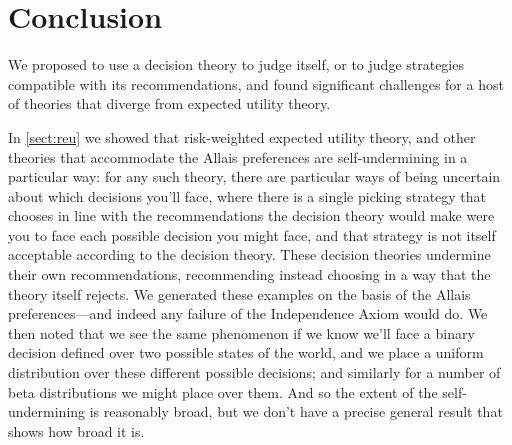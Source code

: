 \documentclass[a4paper]{article}
\newcommand\U{\mathfrak{U}} %
\newcommand{\todoold}[2][]{\todo[backgroundcolor=white,bordercolor=orange!10,linecolor=gray!10, #1,caption={},textcolor=gray]{Pre-rev: #2}}
\newcommand{\todooldinfo}[2][]{\todoold[#1]{#2}}
\renewcommand{\color}[1]{}
\newenvironment{colored}[1]{\leavevmode\color{#1}}{}
\newcommand\SetDelimiter[1][]{
	\nonscript\,#1\vert \allowbreak \nonscript\,\mathopen{}}
\providecommand\given{\SetDelimiter}
\newenvironment{CCM rewritten}
{\begingroup\color{blue}} %
{\endgroup}              %
\begin{document}
%
%
%
%
%



\section{Conclusion}


We proposed to use a decision theory to judge itself, or to judge strategies compatible with its recommendations, and found significant challenges for a host of theories that diverge from expected utility theory. 


In \cref{sect:reu} we showed that risk-weighted expected utility theory, and other theories that accommodate the Allais preferences are self-undermining in a particular way: for any such theory, there are particular ways of being uncertain about which decisions you'll face, where there is a single picking strategy that chooses in line with the recommendations the decision theory would make were you to face each possible decision you might face, and that strategy is not itself acceptable according to the decision theory. These decision theories undermine their own recommendations, recommending instead choosing in a way that the theory itself rejects. We generated these examples on the basis of the Allais preferences---and indeed any failure of the Independence Axiom would do. We then noted that we see the same phenomenon if we know we'll face a binary decision defined over two possible states of the world, and we place a uniform distribution over these different possible decisions; and similarly for a number of beta distributions we might place over them. And so the extent of the self-undermining is reasonably broad, but we don't have a precise general result that shows how broad it is.
\end{document}
